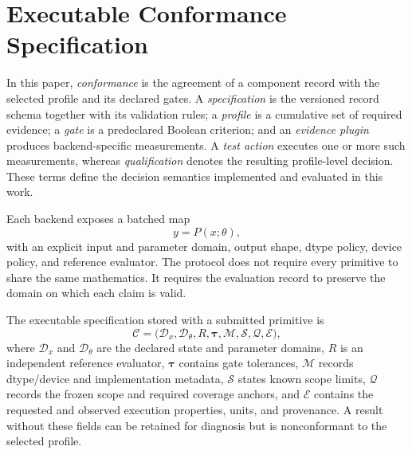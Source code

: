 \documentclass[preprint,12pt,authoryear]{elsarticle}
\begin{document}
\section{Executable Conformance Specification}
In this paper, \emph{conformance} is the agreement of a component record with the selected profile and its declared gates. A \emph{specification} is the versioned record schema together with its validation rules; a \emph{profile} is a cumulative set of required evidence; a \emph{gate} is a predeclared Boolean criterion; and an \emph{evidence plugin} produces backend-specific measurements. A \emph{test action} executes one or more such measurements, whereas \emph{qualification} denotes the resulting profile-level decision. These terms define the decision semantics implemented and evaluated in this work.

Each backend exposes a batched map
\begin{equation}
    y=P(x;\theta),
\end{equation}
with an explicit input and parameter domain, output shape, dtype policy, device policy, and reference evaluator. The protocol does not require every primitive to share the same mathematics. It requires the evaluation record to preserve the domain on which each claim is valid.

The executable specification stored with a submitted primitive is
\begin{equation}
  \mathcal{C}=\bigl(\mathcal{D}_{x},\mathcal{D}_{\theta},R,
  \boldsymbol{\tau},\mathcal{M},\mathcal{S},\mathcal{Q},\mathcal{E}\bigr),
\end{equation}
where $\mathcal{D}_{x}$ and $\mathcal{D}_{\theta}$ are the declared state and parameter domains, $R$ is an independent reference evaluator, $\boldsymbol{\tau}$ contains gate tolerances, $\mathcal{M}$ records dtype/device and implementation metadata, $\mathcal{S}$ states known scope limits, $\mathcal{Q}$ records the frozen scope and required coverage anchors, and $\mathcal{E}$ contains the requested and observed execution properties, units, and provenance. A result without these fields can be retained for diagnosis but is nonconformant to the selected profile.
\end{document}
